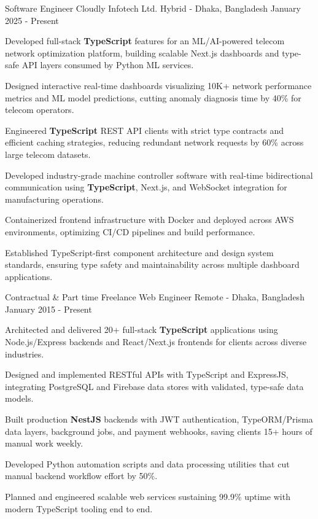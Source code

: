 
\begin{cventries}

  \cventry
    {Software Engineer}
    {Cloudly Infotech Ltd.}
    {Hybrid - Dhaka, Bangladesh}
    {January 2025 - Present}
    {
      \begin{cvitems}
        \item {Developed full-stack \textbf{TypeScript} features for an ML/AI-powered telecom network optimization platform, building scalable Next.js dashboards and type-safe API layers consumed by Python ML services.}
        \item {Designed interactive real-time dashboards visualizing 10K+ network performance metrics and ML model predictions, cutting anomaly diagnosis time by 40\% for telecom operators.}
        \item {Engineered \textbf{TypeScript} REST API clients with strict type contracts and efficient caching strategies, reducing redundant network requests by 60\% across large telecom datasets.}
        \item {Developed industry-grade machine controller software with real-time bidirectional communication using \textbf{TypeScript}, Next.js, and WebSocket integration for manufacturing operations.}
        \item {Containerized frontend infrastructure with Docker and deployed across AWS environments, optimizing CI/CD pipelines and build performance.}
        \item {Established TypeScript-first component architecture and design system standards, ensuring type safety and maintainability across multiple dashboard applications.}
      \end{cvitems}
    }

  \cventry
    {Contractual \& Part time}
    {Freelance Web Engineer}
    {Remote - Dhaka, Bangladesh}
    {January 2015 - Present}
    {
      \begin{cvitems}
        \item {Architected and delivered 20+ full-stack \textbf{TypeScript} applications using Node.js/Express backends and React/Next.js frontends for clients across diverse industries.}
        \item {Designed and implemented RESTful APIs with TypeScript and ExpressJS, integrating PostgreSQL and Firebase data stores with validated, type-safe data models.}
        \item {Built production \textbf{NestJS} backends with JWT authentication, TypeORM/Prisma data layers, background jobs, and payment webhooks, saving clients 15+ hours of manual work weekly.}
        \item {Developed Python automation scripts and data processing utilities that cut manual backend workflow effort by 50\%.}
        \item {Planned and engineered scalable web services sustaining 99.9\% uptime with modern TypeScript tooling end to end.}
      \end{cvitems}
    }


\end{cventries}
